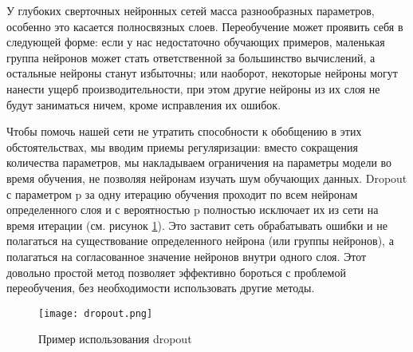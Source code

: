 У глубоких сверточных нейронных сетей масса разнообразных параметров, особенно это касается полносвязных слоев. Переобучение может проявить себя в следующей форме: если у нас недостаточно обучающих примеров, маленькая группа нейронов может стать ответственной за большинство вычислений, а остальные нейроны станут избыточны; или наоборот, некоторые нейроны могут нанести ущерб производительности, при этом другие нейроны из их слоя не будут заниматься ничем, кроме исправления их ошибок.

Чтобы помочь нашей сети не утратить способности к обобщению в этих обстоятельствах, мы вводим приемы регуляризации: вместо сокращения количества параметров, мы накладываем ограничения на параметры модели во время обучения, не позволяя нейронам изучать шум обучающих данных. Dropout с параметром p за одну итерацию обучения проходит по всем нейронам определенного слоя и с вероятностью p полностью исключает их из сети на время итерации (см. рисунок \ref{sec:design:network:dropout}). Это заставит сеть обрабатывать ошибки и не полагаться на существование определенного нейрона (или группы нейронов), а полагаться на согласованное значение нейронов внутри одного слоя. Этот довольно простой метод позволяет эффективно бороться с проблемой переобучения, без необходимости использовать другие методы.

\begin{figure}[h]
\centering
	\texttt{[image: dropout.png]}
	\caption{Пример использования dropout}
	\label{sec:design:network:dropout}
\end{figure}

